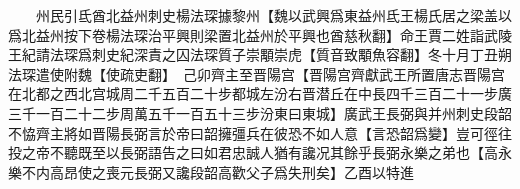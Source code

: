 　　州民引氐酋北益州刺史楊法琛據黎州【魏以武興爲東益州氐王楊氏居之梁盖以爲北益州按下卷楊法琛治平興則梁置北益州於平興也酋慈秋翻】命王賈二姓詣武陵王紀請法琛爲刺史紀深責之囚法琛質子崇顒崇虎【質音致顒魚容翻】冬十月丁丑朔法琛遣使附魏【使疏吏翻】　己卯齊主至晋陽宫【晋陽宫齊獻武王所置唐志晋陽宫在北都之西北宫城周二千五百二十步都城左汾右晋潜丘在中長四千三百二十一步廣三千一百二十二步周萬五千一百五十三步汾東曰東城】廣武王長弼與并州刺史段韶不恊齊主將如晋陽長弼言於帝曰韶擁彊兵在彼恐不如人意【言恐韶爲變】豈可徑往投之帝不聽既至以長弼語告之曰如君忠誠人猶有讒况其餘乎長弼永樂之弟也【高永樂不内高昂使之喪元長弼又讒段韶高歡父子爲失刑矣】乙酉以特進